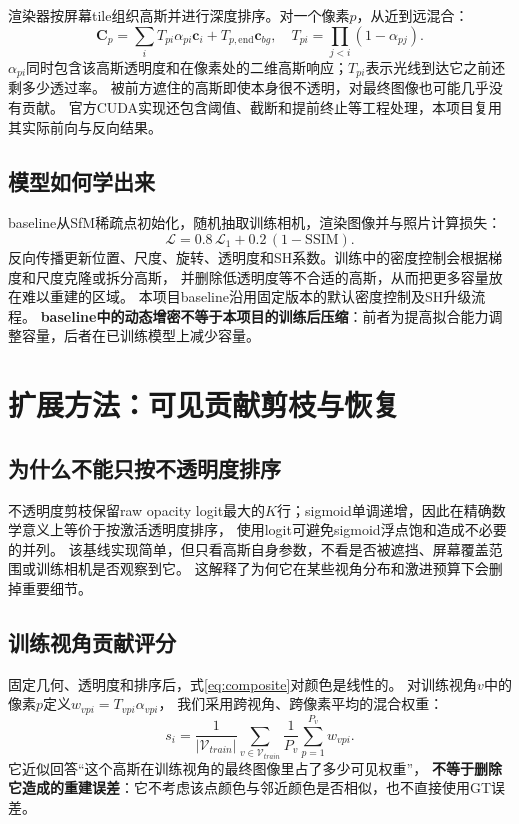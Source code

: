 \documentclass[UTF8,fontset=fandol,zihao=-4,a4paper]{ctexart}
\begin{document}
渲染器按屏幕tile组织高斯并进行深度排序。对一个像素$p$，从近到远混合：
\begin{equation}\mathbf C_p=\sum_i T_{pi}\alpha_{pi}\mathbf c_i+T_{p,\mathrm{end}}\mathbf c_{bg},
\quad T_{pi}=\prod_{j<i}(1-\alpha_{pj}).\label{eq:composite}\end{equation}
$\alpha_{pi}$同时包含该高斯透明度和在像素处的二维高斯响应；$T_{pi}$表示光线到达它之前还剩多少透过率。
被前方遮住的高斯即使本身很不透明，对最终图像也可能几乎没有贡献。
官方CUDA实现还包含阈值、截断和提前终止等工程处理，本项目复用其实际前向与反向结果。

\subsection{模型如何学出来}
baseline从SfM稀疏点初始化，随机抽取训练相机，渲染图像并与照片计算损失：
\begin{equation}\mathcal L=0.8\,\mathcal L_1+0.2\,(1-\mathrm{SSIM}).\end{equation}
反向传播更新位置、尺度、旋转、透明度和SH系数。训练中的密度控制会根据梯度和尺度克隆或拆分高斯，
并删除低透明度等不合适的高斯，从而把更多容量放在难以重建的区域。
本项目baseline沿用固定版本的默认密度控制及SH升级流程。
\textbf{baseline中的动态增密不等于本项目的训练后压缩}：前者为提高拟合能力调整容量，后者在已训练模型上减少容量。

\section{扩展方法：可见贡献剪枝与恢复}
\subsection{为什么不能只按不透明度排序}
不透明度剪枝保留raw opacity logit最大的$K$行；sigmoid单调递增，因此在精确数学意义上等价于按激活透明度排序，
使用logit可避免sigmoid浮点饱和造成不必要的并列。
该基线实现简单，但只看高斯自身参数，不看是否被遮挡、屏幕覆盖范围或训练相机是否观察到它。
这解释了为何它在某些视角分布和激进预算下会删掉重要细节。

\subsection{训练视角贡献评分}
固定几何、透明度和排序后，式\eqref{eq:composite}对颜色是线性的。
对训练视角$v$中的像素$p$定义$w_{vpi}=T_{vpi}\alpha_{vpi}$，
我们采用跨视角、跨像素平均的混合权重：
\begin{equation}s_i=\frac{1}{|\mathcal V_{train}|}\sum_{v\in\mathcal V_{train}}
\frac{1}{P_v}\sum_{p=1}^{P_v}w_{vpi}.\label{eq:score}\end{equation}
它近似回答“这个高斯在训练视角的最终图像里占了多少可见权重”，
\textbf{不等于删除它造成的重建误差}：它不考虑该点颜色与邻近颜色是否相似，也不直接使用GT误差。
\end{document}

